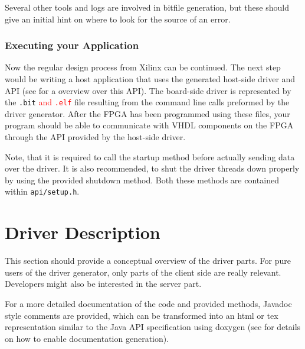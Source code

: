 \documentclass{report}
\begin{document}
Several other tools and logs are involved in bitfile generation, but these should give an initial hint on where to look for the source of an error.

\subsection{Executing your Application}
Now the regular design process from Xilinx can be continued. The next step would be writing a host application that uses the generated host-side driver and API (see  for a overview over this API). The board-side driver is represented by the \texttt{.bit} \textcolor{red}{and \texttt{.elf}} file resulting from the command line calls preformed by the driver generator. After the FPGA has been programmed using these files, your program should be able to communicate with VHDL components on the FPGA through the API provided by the host-side driver.

Note, that it is required to call the startup method before actually sending data over the driver. It is also recommended, to shut the driver threads down properly by using the provided shutdown method. Both these methods are contained within \texttt{api/setup.h}.

\chapter{Driver Description}
This section should provide a conceptual overview of the driver parts. For pure users of the driver generator, only parts of the client side are really relevant. Developers might also be interested in the server part.

For a more detailed documentation of the code and provided methods, Javadoc style comments are provided, which can be transformed into an html or tex representation similar to the Java API specification using doxygen (see  for details on how to enable documentation generation).
\end{document}
